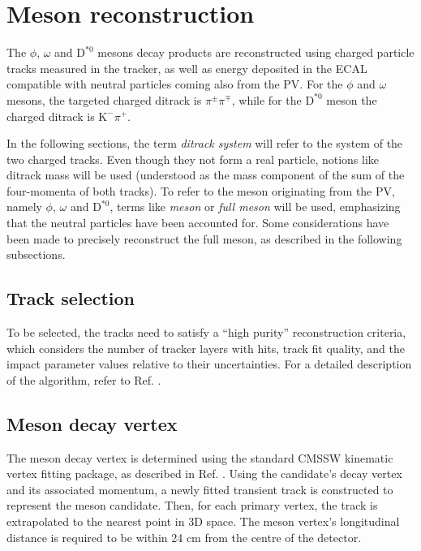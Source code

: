 \section{Meson reconstruction}\label{sec:meson_reconstruction}

The $\phi$, $\omega$ and $\text{D}^{*0}$ mesons decay products are reconstructed using charged particle tracks measured in the tracker, as well as energy deposited in the ECAL compatible with neutral particles coming also from the PV. For the $\phi$ and $\omega$ mesons, the targeted charged ditrack is $\pi^\pm\pi^\mp$, while for the $\text{D}^{*0}$ meson the charged ditrack is $\text{K}^{-}\pi^{+}$.

In the following sections, the term \textit{ditrack system} will refer to the system of the two charged tracks. Even though they not form a real particle, notions like ditrack mass will be used (understood as the mass component of the sum of the four-momenta of both tracks). To refer to the meson originating from the PV, namely $\phi$, $\omega$ and $\text{D}^{*0}$, terms like \textit{meson} or \textit{full meson} will be used, emphasizing that the neutral particles have been accounted for. Some considerations have been made to precisely reconstruct the full meson, as described in the following subsections.

\subsection{Track selection}
To be selected, the tracks need to satisfy a ``high purity'' reconstruction criteria, which considers the number of tracker layers with hits, track fit quality, and the impact parameter values relative to their uncertainties. For a detailed description of the algorithm, refer to Ref. \cite{CMS:2014pgm}.

\subsection{Meson decay vertex}
The meson decay vertex is determined using the standard CMSSW \cite{CMSSW} kinematic vertex fitting package, as described in Ref. \cite{Prokofiev:2005zz}. Using the candidate's decay vertex and its associated momentum, a newly fitted transient track is constructed to represent the meson candidate. Then, for each primary vertex, the track is extrapolated to the nearest point in 3D space. The meson vertex's longitudinal distance is required to be within 24 cm from the centre of the detector.

